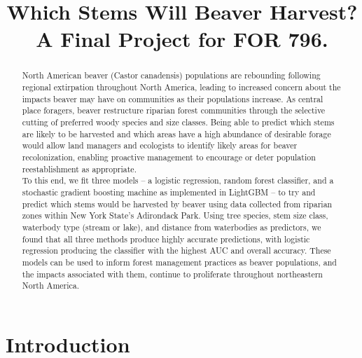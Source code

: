 \documentclass[]{elsarticle} %
\begin{document}
\begin{frontmatter}

  \title{Which Stems Will Beaver Harvest? A Final Project for FOR 796.}
      
  \begin{abstract}
  North American beaver (Castor canadensis) populations are rebounding following
  regional extirpation throughout North America, leading to increased concern
  about the impacts beaver may have on communities as their populations increase.
  As central place foragers, beaver restructure riparian forest communities
  through the selective cutting of preferred woody species and size classes.
  Being able to predict which stems are likely to be harvested and which areas
  have a high abundance of desirable forage would allow land managers and
  ecologists to identify likely areas for beaver recolonization, enabling
  proactive management to encourage or deter population reestablishment
  as appropriate.\\
  To this end, we fit three models -- a logistic regression, random forest
  classifier, and a stochastic gradient boosting machine as implemented in
  LightGBM -- to try and predict which stems would be harvested by beaver using
  data collected from riparian zones within New York State's Adirondack Park.
  Using tree species, stem size class, waterbody type (stream or lake), and
  distance from waterbodies as predictors, we found that all three methods
  produce highly accurate predictions, with logistic regression producing the
  classifier with the highest AUC and overall accuracy. These models can be used
  to inform forest management practices as beaver populations, and the impacts
  associated with them, continue to proliferate throughout northeastern North
  America.
  \end{abstract}
  
 \end{frontmatter}

\hypertarget{introduction}{%
\section{Introduction}\label{introduction}}
\end{document}
